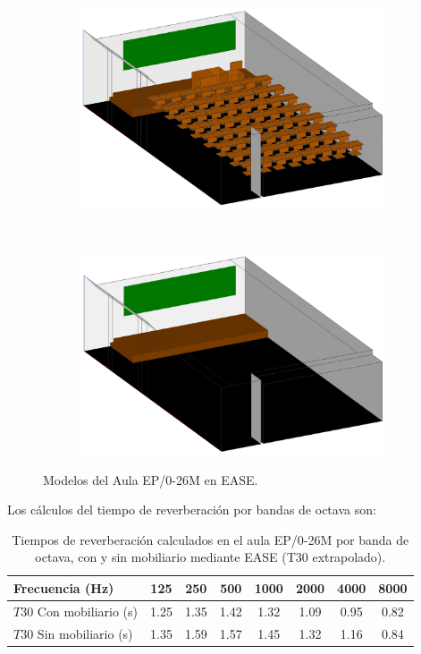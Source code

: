 \begin{figure}[ht]
    \centering
    \begin{subfigure}[b]{0.45\textwidth}
    	\centering
        \includegraphics[width=0.9\linewidth]{archivos/capturas/easeepsllena.png}
    \end{subfigure}
    ~ %
    \begin{subfigure}[b]{0.45\textwidth}
    	\centering
        \includegraphics[width=0.9\linewidth]{archivos/capturas/easeepsvacia.png}
    \end{subfigure}
    \caption{Modelos del Aula EP/0-26M en EASE.}\label{modeloepsease}
\end{figure}
\FloatBarrier 


Los cálculos del tiempo de reverberación por bandas de octava son:

\begin{table}[ht]
\centering
{
\begin{tabular}{@{}lccccccc@{}}
\toprule
Frecuencia (Hz) & 125 & 250 & 500 & 1000 & 2000 & 4000 & 8000 \\ \midrule
$T30$ Con mobiliario (s) & 1.25 & 1.35 & 1.42 & 1.32 & 1.09 & 0.95 & 0.82 \\
$T30$ Sin mobiliario (s) & 1.35 & 1.59 & 1.57 & 1.45 & 1.32 & 1.16 & 0.84 \\ \bottomrule
\end{tabular}
}
\caption{Tiempos de reverberación calculados en el aula EP/0-26M por banda de octava, con y sin mobiliario mediante EASE (T30 extrapolado).}
\label{tab:revepsease}
\end{table}
\FloatBarrier

